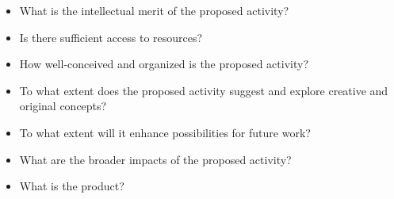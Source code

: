 \begin{itemize}
\tightlist
\item
  What is the intellectual merit of the proposed activity?
\item
  Is there sufficient access to resources?
\item
  How well-conceived and organized is the proposed activity?
\item
  To what extent does the proposed activity suggest and explore creative
  and original concepts?
\item
  To what extent will it enhance possibilities for future work?
\item
  What are the broader impacts of the proposed activity?
\item
  What is the product?
\end{itemize}

